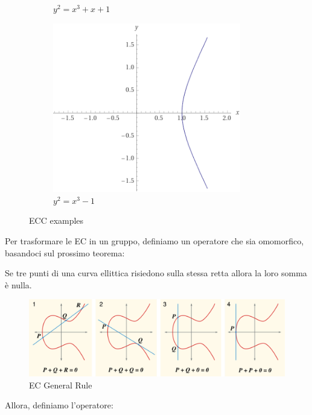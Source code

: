 \begin{figure}[h]
\begin{subfigure}[b]{0.3\textwidth}
         \caption{$y^2=x^3+x+1$}
         \label{fig:ec2}
     \end{subfigure}
     \hfill
        \begin{subfigure}[b]{0.3\textwidth}
         \centering
         \includegraphics[width=0.9\textwidth]{image/ecc/ec3.png}
         \caption{$y^2=x^3-1$}
         \label{fig:ec3}
     \end{subfigure}
        \caption{ECC examples}
        \label{fig:ecc}
\end{figure}
Per trasformare le EC in un gruppo, definiamo un operatore che sia omomorfico, basandoci sul prossimo teorema:
\begin{theorem}\label{thm:ecrule}
Se tre punti di una curva ellittica risiedono sulla stessa retta allora la loro somma è nulla.
\end{theorem}
\begin{figure}[ht]
    \centering
    \includegraphics{image/ecc/ecrule.png}
    \caption{EC General Rule}
    \label{fig:ecrule}
\end{figure}
Allora, definiamo l'operatore:
